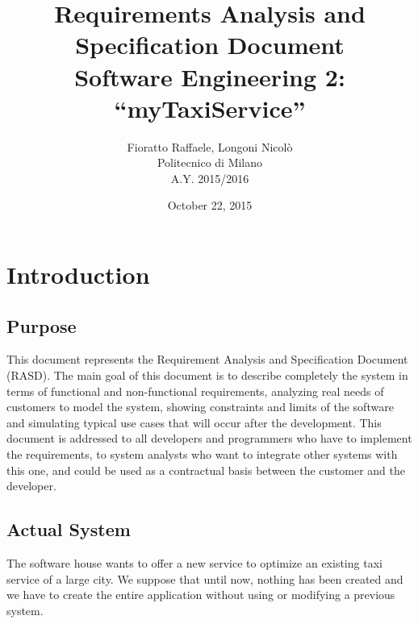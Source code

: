 \documentclass[a4paper,12pt,dvipsnames]{article}%
\begin{document}
\begin{figure}
  \centering
	\def\svgwidth{\columnwidth}
    \resizebox{0.35\textwidth}{!}{}
\end{figure}
\title{{\Huge \textbf{R}equirements \textbf{A}nalysis and\\
\textbf{S}pecification \textbf{D}ocument}\\{\Large Software Engineering 2: ``myTaxiService''}}

\author{Fioratto Raffaele, Longoni Nicol\`{o}
\\Politecnico di Milano
\\{\small A.Y. 2015/2016}}
\date{October 22, 2015}
\maketitle
\newpage
\tableofcontents
\newpage
\section{Introduction}

\subsection{Purpose}
This document represents the Requirement Analysis and Specification Document
(RASD). The main goal of this document is to describe completely the system
in terms of functional and non-functional requirements, analyzing real needs
of customers to model the system, showing constraints and limits
of the software and simulating typical use cases that will occur after the
development. This document is addressed to all developers and programmers who
have to implement the requirements, to system analysts who want to integrate
other systems with this one, and could be used as a contractual basis between
the customer and the developer.

\subsection{Actual System}
The software house wants to offer a new service to optimize an existing 
taxi service of a large city. We suppose that until now, nothing has been 
created and we have to create the entire application without using or modifying 
a previous system.
\end{document}
